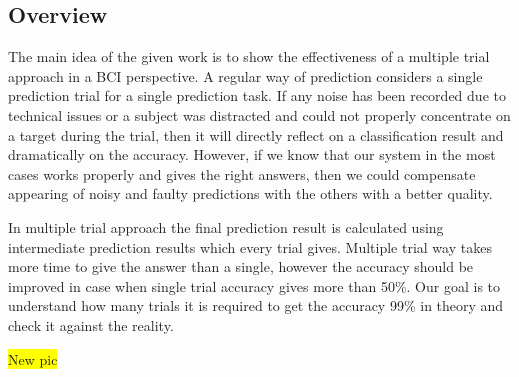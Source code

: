 \documentclass[12pt]{article}
\begin{document}
\subsection{Overview}
The main idea of the given work is to show the effectiveness of a multiple trial approach in a BCI perspective. 
A regular way of prediction considers a single prediction trial for a single prediction task. If any noise has been recorded due to technical issues or a subject was distracted and could not properly concentrate on a target during the trial, then it will directly reflect on a classification result and dramatically on the accuracy. However, if we know that our system in the most cases works properly and gives the right answers, then we could compensate appearing of noisy and faulty predictions with the others with a better quality.

In multiple trial approach the final prediction result is calculated using intermediate prediction results which every trial gives. Multiple trial way takes more time to give the answer than a single, however the accuracy should be improved in case when single trial accuracy gives more than 50\%. Our goal is to understand how many trials it is required to get the accuracy 99\% in theory and check it against the reality.

\colorbox{yellow}{New pic}
\end{document}
